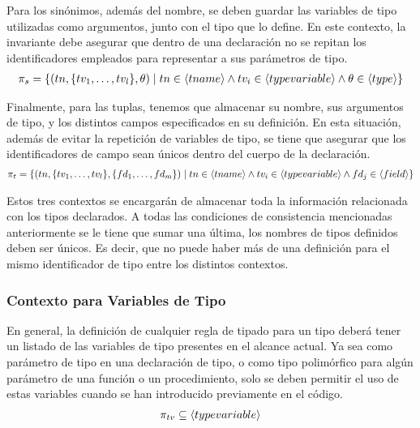 Para los sinónimos, además del nombre, se deben guardar las variables de tipo utilizadas como argumentos, junto con el tipo que lo define.
En este contexto, la invariante debe asegurar que dentro de una declaración no se repitan los identificadores empleados para representar a sus parámetros de tipo.
\begin{gather*}
\pi_{s} =
\{
(tn, \{ tv_1, \ldots, tv_l \} , \theta) \mid 
tn \in \langle tname \rangle
\wedge
tv_i \in \langle typevariable \rangle
\wedge
\theta \in \langle type \rangle
\}
\end{gather*}

Finalmente, para las tuplas, tenemos que almacenar su nombre, sus argumentos de tipo, y los distintos campos especificados en su definición.
En esta situación, además de evitar la repetición de variables de tipo, se tiene que asegurar que los identificadores de campo sean únicos dentro del cuerpo de la declaración.
\begin{gather*}
\pi_{t} =
\{
(tn, \{ tv_1, \ldots, tv_l \}, \{ fd_1, \ldots, fd_m \} ) \mid
tn \in \langle tname \rangle 
\wedge
tv_i \in \langle typevariable \rangle
\wedge
fd_j \in \langle field \rangle
\}
\end{gather*}

Estos tres contextos se encargarán de almacenar toda la información relacionada con los tipos declarados.%
A todas las condiciones de consistencia mencionadas anteriormente se le tiene que sumar una última, los nombres de tipos definidos deben ser únicos.
Es decir, que no puede haber más de una definición para el mismo identificador de tipo entre los distintos contextos.

\subsubsection{Contexto para Variables de Tipo}

En general, la definición de cualquier regla de tipado para un tipo deberá tener un listado de las variables de tipo presentes en el alcance actual.
Ya sea como parámetro de tipo en una declaración de tipo, o como tipo polimórfico para algún parámetro de una función o un procedimiento, solo se deben permitir el uso de estas variables cuando se han introducido previamente en el código.
\begin{gather*}
\pi_{tv} \subseteq \langle typevariable \rangle
\end{gather*}

